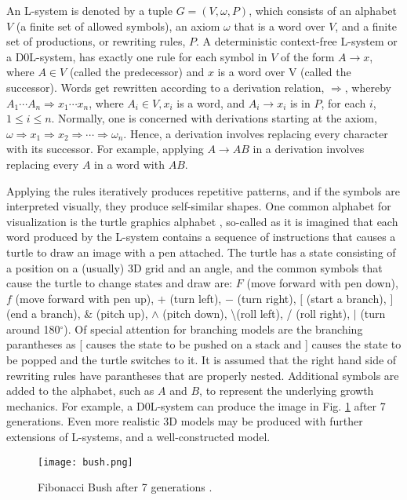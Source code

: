 \documentclass{llncs}
\begin{document}
	An L-system is denoted by a tuple $G=(V,\omega,P)$, which consists of an alphabet $V$ (a finite set of allowed symbols), an axiom $\omega$ that is a word over $V$, and a finite set of productions, or rewriting rules, $P$. A deterministic context-free L-system or a D0L-system, has exactly one rule for each symbol in $V$ of the form $A \rightarrow x$, where $A  \in  V$ (called the predecessor) and $x$ is a word over V (called the successor). Words get rewritten according to a derivation relation, $\Rightarrow$, whereby $A_{1} \cdots A_{n} \Rightarrow x_{1} \cdots x_{n}$, where $A_{i}  \in V, x_{i}$ is a word, and $A_{i} \rightarrow x_{i}$ is in $P$, for each $i$, $1 \leq i \leq n$. Normally, one is concerned with derivations starting at the axiom, $\omega \Rightarrow x_{1} \Rightarrow x_{2} \Rightarrow \cdots \Rightarrow \omega_{n}$. Hence, a derivation involves replacing every character with its successor. For example, applying $A \to AB$ in a derivation involves replacing every $A$ in a word with $AB$. 
	
	Applying the rules iteratively produces repetitive patterns, and if the symbols are interpreted visually, they produce self-similar shapes. One common alphabet for visualization is the turtle graphics alphabet \cite{beauty}, so-called as it is imagined that each word produced by the L-system contains a sequence of instructions that causes a turtle to draw an image with a pen attached. The turtle has a state consisting of a position on a (usually) 3D grid and an angle, and the common symbols that cause the turtle to change states and draw are: $F$ (move forward with pen down), $f$ (move forward with pen up), $+$ (turn left), $-$ (turn right), $[$ (start a branch), $]$ (end a branch), $\&$ (pitch up), $\wedge$ (pitch down), \textbackslash (roll left), / (roll right), $\mid$ (turn around 180$^\circ$). Of special attention for branching models are the branching parantheses as [ causes the state to be pushed on a stack and ] causes the state to be popped and the turtle switches to it. It is assumed that the right hand side of rewriting rules have parantheses that are properly nested.  Additional symbols are added to the alphabet, such as $A$ and $B$, to represent the underlying growth mechanics. For example, a D0L-system can produce the image in Fig. \ref{fig:1} after 7 generations. Even more realistic 3D models may be produced with further extensions of L-systems, and a well-constructed model.
	
	\begin{figure}
		\centering
		\texttt{[image: bush.png]}
		\caption{Fibonacci Bush after 7 generations \cite{beauty}.}
		\label{fig:1}
	\end{figure}
	
\end{document}
